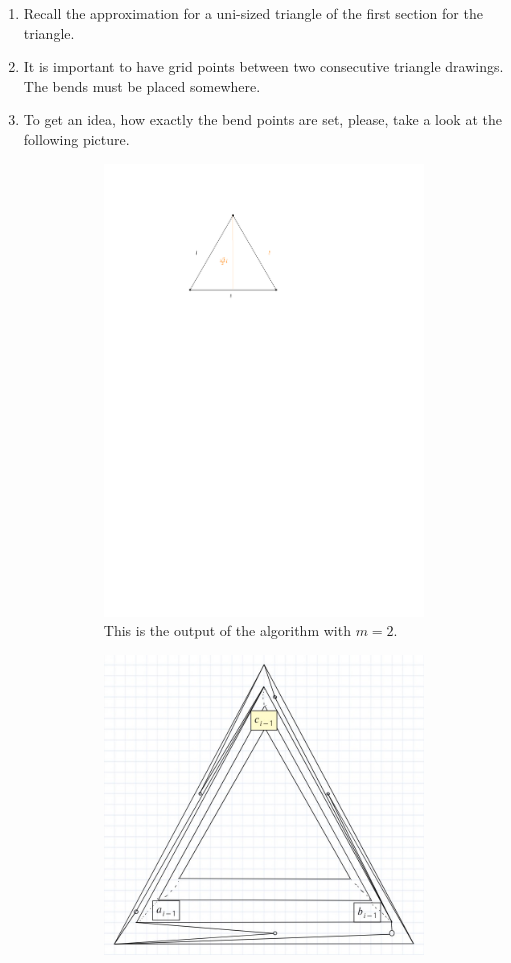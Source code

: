 \begin{enumerate}
	\item Recall the approximation for a uni-sized triangle of the first section for the triangle.
	\item It is important to have grid points between two consecutive triangle drawings. The bends must be placed somewhere.
	\item To get an idea, how exactly the bend points are set, please, take a look at the following picture.
	\begin{figure}[H]
		\centering
			\begin{subfigure}{0.8\textwidth}
			\centering
			\includegraphics[width=0.8\linewidth,page=7]{drawings/previous-results.pdf}
			\caption{This is the output of the algorithm with $m = 2$.}
		\end{subfigure}
		\begin{subfigure}{0.8\textwidth}
			\centering
			\includegraphics[width=0.8\linewidth]{drawings/variant_triangles_1.jpg}

\end{subfigure}
\end{figure}
\end{enumerate}
